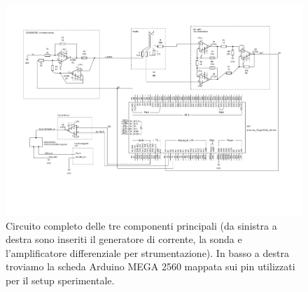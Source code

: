 \documentclass[fleqn,varvw,preprintnumbers,citeautoscript]{memo}
\begin{document}
%


\begin{turnpage}
    \begin{figure}[p]
        \centering
        \includegraphics[width=\linewidth,trim={1.5cm 3.5cm 2cm 2cm},clip]{SCHEMA_full1.pdf}
        \caption{Circuito completo delle tre componenti principali (da sinistra a destra sono inseriti il generatore di corrente, la sonda e l'amplificatore differenziale per strumentazione). In basso a destra troviamo la scheda Arduino MEGA 2560 mappata sui pin utilizzati per il setup sperimentale. }\label{fig:circuit_memo2}
    \end{figure}
\end{turnpage}
\end{document}
